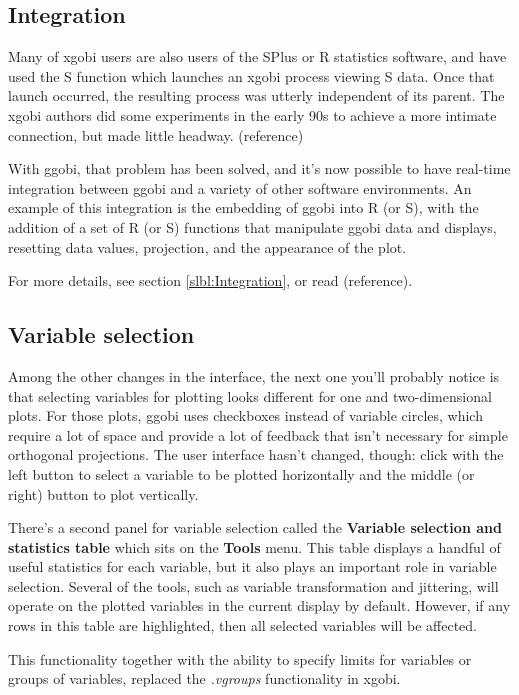 \documentclass[11pt]{article}
\begin{document}
\subsection{Integration}

Many of xgobi users are also users of the SPlus or R statistics
software, and have used the S function which launches an xgobi
process viewing S data.  Once that launch occurred, the resulting
process was utterly independent of its parent.  The xgobi authors
did some experiments in the early 90s to achieve a more intimate
connection, but made little headway.  (reference)

With ggobi, that problem has been solved, and it's now possible
to have real-time integration between ggobi and a variety of
other software environments.  An example of this integration is
the embedding of ggobi into R (or S), with the addition of a set of
R (or S) functions that manipulate ggobi data and displays,
resetting data values, projection, and the appearance of the plot.

For more details, see section \ref{slbl:Integration}, or read
(reference).

\subsection {Variable selection}

Among the other changes in the interface, the next one you'll
probably notice is that selecting variables for plotting looks
different for one and two-dimensional plots.  For those plots, ggobi
uses checkboxes instead of variable circles, which require a lot of
space and provide a lot of feedback that isn't necessary for simple
orthogonal projections.  The user interface hasn't changed, though:
click with the left button to select a variable to be plotted
horizontally and the middle (or right) button to plot vertically.

There's a second panel for variable selection called the {\bf
Variable selection and statistics table} which sits on the {\bf
Tools} menu.  This table displays a handful of useful statistics for
each variable, but it also plays an important role in variable
selection.  Several of the tools, such as variable transformation and
jittering, will operate on the plotted variables in the current
display by default.  However, if any rows in this table are highlighted,
then all selected variables will be affected. 

This functionality together with the ability to specify limits
for variables or groups of variables, replaced the {\em .vgroups}
functionality in xgobi.
\end{document}
